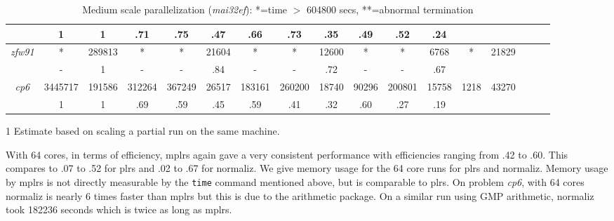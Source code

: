 \documentclass[a4paper,11pt]{article}   \usepackage{authblk} \usepackage[top=1.9cm,bottom=1.9cm,left=1.9cm,right=1.9cm]{geometry}
\newcommand{\progname}{\textsf}
\newcommand{\compname}{\emph}
\newcommand{\plrs}{\progname{plrs}\xspace}
\newcommand{\mplrs}{\progname{mplrs}\xspace}
\newcommand{\norm}{\progname{normaliz}\xspace}
\newcommand{\maief}{\compname{mai32ef}\xspace}
\newcommand{\polytope}{\emph}
\newcommand{\cpsix}{\polytope{cp6}\xspace}
\newcommand{\zfw}{\polytope{zfw91}\xspace}
\begin{document}
\begin{table}[htbp]
\begin{threeparttable}
{\begin{tabular}[ht]{|c||c|c||c|c|c||c|c|c||c|c|c||c|c|c|c|c|}
         & 1              &   1  &  .71 & .75  & .47 &  .66 &  .73 & .35 & .49 &  .52 & .24 &    &      \\
\hline
\zfw     & *              &289813&   *  &   *  &21604&   *  &   *  &12600&  *  &   *  & 6768&  * & 21829\\
         & -              &   1  &   -  &   -  & .84 &   -  &   -  & .72 &  -  &   -  & .67 &    &      \\
\hline
\cpsix   &3445717\tnote{1}&191586&312264&367249&26517&183161&260200&18740&90296&200801&15758&1218&43270 \\
         & 1              &   1  & .69  & .59  & .45 &  .59 &  .41 & .32 & .60 &  .27 & .19 &    &      \\
\hline

\end{tabular}
}
\begin{tablenotes}
\item[1]{Estimate based on scaling a partial run on the same machine.}
\end{tablenotes}
\caption{Medium scale parallelization (\maief):  *=time $>$ 604800 secs, **=abnormal termination}
\label{tab:su64}
\end{threeparttable}
\end{table}

With 64 cores, in terms of efficiency,
\mplrs again gave a very consistent performance with efficiencies ranging from .42 to .60.
This compares to .07 to .52 for \plrs and .02 to .67 for \norm.
We give memory usage for the 64 core runs for \plrs and \norm. Memory usage by \mplrs
is not directly measurable by the \texttt{time} command mentioned above, but is comparable to
\plrs. On problem \cpsix, with 64 cores \norm is nearly 6 times
faster than \mplrs but this is due to the arithmetic package. On a similar run
using GMP arithmetic, \norm took 182236 seconds which is twice as long as \mplrs.
\end{document}
